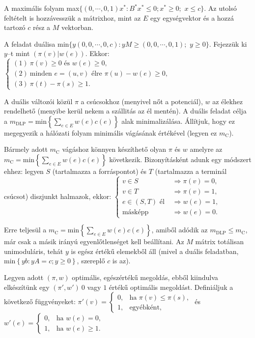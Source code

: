 A maximális folyam max$\{ (0, \cdots,0,1)x^* : B^*x^* \leq 0; x^* \geq 0;$ $x
\leq c \}$. Az utolsó feltételt is hozzávesszük a mátrixhoz, mint az $E$ egy
egységvektor és a hozzá tartozó $c$ rész a $M$ vektorban.

A feladat duálisa min$\{ y(0, 0, \cdots, 0, c) :yM \geq (0, 0, \cdots, 0, 1);$
$y \geq 0 \}$. Fejezzük ki $y$--t mint $\left( \pi\left(v\right) |
w\left(e\right)\right)$.
Ekkor: $\begin{cases} 
(1)~\pi(v) \geq 0 \mbox{ és } w(e) \geq 0, \\
(2)~\mbox{minden } e = (u,v) \mbox{ élre }  \pi(u)-w(e) \geq 0, \\
(3)~\pi(t)-\pi(s) \geq 1. \end{cases}$ 

A duális változói közül $\pi$ a csúcsokhoz (menyivel nőt a potenciál), $w$ az
élekhez rendelhető (menyibe kerül nekem a szállitás az él mentén). A duális
feladat célja a $m_{\text{DLP}}= \mbox{min} \left\{ \sum_{e\in E}^{}
w(e)c(e)\right\}$ alak minimalizálása. Állítjuk, hogy ez megegyezik a hálózati
folyam minimális vágásának értékével (legyen ez $m_{\text{C}}$).

Bármely adott $m_{\mbox{C}}$ vágáshoz könnyen készíthető olyan $\pi$ és $w$
amelyre az $m_{\text{C}}= \mbox{min} \left\{ \sum_{e\in E}^{} w(e)c(e)\right\}$
következik. Bizonyításként adunk egy módszert ehhez: legyen $S$ (tartalmazza a
forráspontot) és $T$ (tartalmazza a terminál csúcsot) diszjunkt halmazok, ekkor:
$\begin{cases}
v \in S &\Rightarrow \pi(v)=0, \\
v \in T &\Rightarrow \pi(v)=1, \\
e \in (S,T) \mbox{ él } &\Rightarrow w(e)=1, \\
\mbox{másképp} &\Rightarrow w(e)=0.
\end{cases}$

Erre teljesül a $m_{\text{C}}= \mbox{min} \left\{ \sum_{e\in E}^{}
w(e)c(e)\right\}$, amiből adódik az $m_{\mbox{DLP}} \leq m_{\mbox{C}}$, már csak
a másik irányú egyenlőtlenséget kell beállítani. Az $M$ mátrix totálisan
unimoduláris, tehát $y$ is egész értékű elemekből áll (mivel a duális
feladatban, min$\left\{ yb:yA=c; y\geq 0 \right\}$, szereplő $c$ is az).

Legyen adott $(\pi,w)$ optimális, egészértékű megoldás, ebből kiindulva
elkészítünk egy $(\pi',w')~0$ vagy $1$ értékű optimális megoldást. Definiáljuk a
következő függvényeket:
$\pi'(v)=
\begin{cases}
0, &\mbox{ha } \pi(v) \leq \pi(s), \\
1, &\mbox{egyébként}, 
\end{cases}$ és
$w'(e)=
\begin{cases}
0, &\mbox{ha } w(e)=0, \\
1, &\mbox{ha } w(e) \geq 1.
\end{cases}$ 

